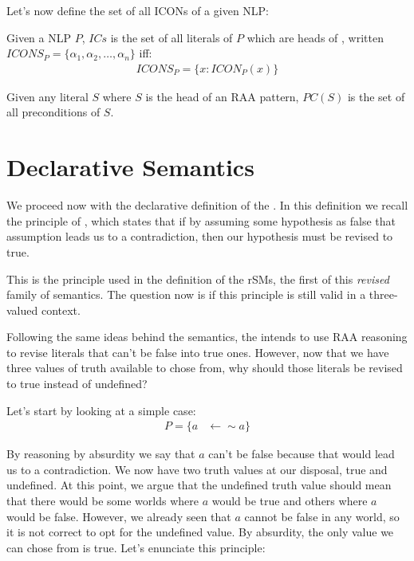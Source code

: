 Let's now define the set of all ICONs of a given NLP:

\begin{definition}
Given a NLP $P$, $ICs$ is the set of all literals of $P$ which are heads of \ICONs, written $ICONS_{P}=\{\alpha_{1},\alpha_{2},\ldots,\alpha_{n}\}$ iff:
\begin{align*}
ICONS_{P}=\{x:ICON_{P}(x)\}
\end{align*}

\end{definition}


\begin{definition}
Given any literal $S$ where $S$ is the head of an RAA pattern, $PC(S)$ is the set of all preconditions of $S$.
\end{definition}




\section{Declarative Semantics}
We proceed now with the declarative definition of the \rwfs. In this definition we recall the principle of \raa, which states that if by assuming some hypothesis as false that assumption leads us to a contradiction, then our hypothesis must be revised to true. 

This is the principle used in the definition of the rSMs, the first of this \emph{revised} family of semantics. The question now is if this principle is still valid in a three-valued context.

Following the same ideas behind the \rsms semantics, the \rwfs intends to use RAA reasoning to revise literals that can't be false into true ones. However, now that we have three values of truth available to chose from, why should those literals be revised to true instead of undefined?

Let's start by looking at a simple case: 
\begin{align*}
P=\{a & \leftarrow\sim a\}
\end{align*}

By reasoning by absurdity we say that $a$ can't be false because that would lead us to a contradiction. We now have two truth values at our disposal, true and undefined. At this point, we argue that the undefined truth value should mean that there would be some worlds where $a$ would be true and others where $a$ would be false. However, we already seen that $a$ cannot be false in any world, so it is not correct to opt for the undefined value. By absurdity, the only value we can chose from is true. Let's enunciate this principle:



